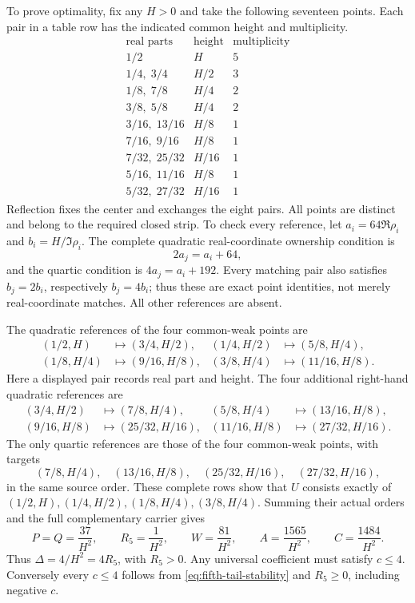 To prove optimality, fix any \(H>0\) and take the following seventeen
points. Each pair in a table row has the indicated common height and
multiplicity.
\[
 \begin{array}{c|c|c}
 \text{real parts}&\text{height}&\text{multiplicity}\\ \hline
 1/2&H&5\\
 1/4,\;3/4&H/2&3\\
 1/8,\;7/8&H/4&2\\
 3/8,\;5/8&H/4&2\\
 3/16,\;13/16&H/8&1\\
 7/16,\;9/16&H/8&1\\
 7/32,\;25/32&H/16&1\\
 5/16,\;11/16&H/8&1\\
 5/32,\;27/32&H/16&1
 \end{array}
\]
Reflection fixes the center and exchanges the eight pairs. All points
are distinct and belong to the required closed strip. To check every
reference, let \(a_i=64\Re\rho_i\) and
\(b_i=H/\Im\rho_i\). The complete quadratic real-coordinate ownership
condition is
\[
 2a_j=a_i+64,
\]
and the quartic condition is \(4a_j=a_i+192\).
Every matching pair also satisfies \(b_j=2b_i\), respectively
\(b_j=4b_i\); thus these are exact point identities, not merely
real-coordinate matches. All other references are absent.

The quadratic references of the four common-weak points are
\[
 \begin{aligned}
 (1/2,H)&\longmapsto(3/4,H/2),&
 (1/4,H/2)&\longmapsto(5/8,H/4),\\
 (1/8,H/4)&\longmapsto(9/16,H/8),&
 (3/8,H/4)&\longmapsto(11/16,H/8).
 \end{aligned}
\]
Here a displayed pair records real part and height.
The four additional right-hand quadratic references are
\[
 \begin{aligned}
 (3/4,H/2)&\longmapsto(7/8,H/4),&
 (5/8,H/4)&\longmapsto(13/16,H/8),\\
 (9/16,H/8)&\longmapsto(25/32,H/16),&
 (11/16,H/8)&\longmapsto(27/32,H/16).
 \end{aligned}
\]
The only quartic references are those of the four common-weak points,
with targets
\[
 (7/8,H/4),\quad (13/16,H/8),\quad
 (25/32,H/16),\quad (27/32,H/16),
\]
in the same source order. These complete rows show that \(U\) consists
exactly of \((1/2,H),(1/4,H/2),(1/8,H/4),(3/8,H/4)\).
Summing their actual orders and the full complementary carrier gives
\[
 P=Q=\frac{37}{H^2},\qquad R_5=\frac1{H^2},\qquad
 W=\frac{81}{H^2},\qquad A=\frac{1565}{H^2},\qquad
 C=\frac{1484}{H^2}.
\]
Thus \(\Delta=4/H^2=4R_5\), with \(R_5>0\). Any universal coefficient
must satisfy \(c\le4\). Conversely every \(c\le4\) follows from
\eqref{eq:fifth-tail-stability} and \(R_5\ge0\), including negative \(c\).

